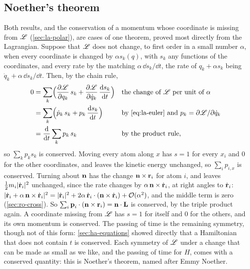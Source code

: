 \subsection*{Noether's theorem}

Both results, and the conservation of a momentum whose coordinate is
missing from $\mathscr{L}$ (\cref{sec:la-polar}), are cases of one theorem,
proved most directly from the Lagrangian. Suppose that $\mathscr{L}$ does not
change, to first order in a small number $\alpha$, when every coordinate
is changed by $\alpha s_k(q)$, with $s_k$ any functions of the
coordinates, and every rate by the matching $\alpha\,\dd s_k/\dd t$, the
rate of $q_k + \alpha s_k$ being $\dot{q}_k + \alpha\,\dd s_k/\dd t$. Then,
by the chain rule,
\begin{align*}
   0 &= \sum_k\Bigl(\frac{\partial\Lag}{\partial q_k}\,s_k
   + \frac{\partial\Lag}{\partial\dot{q}_k}\,\frac{\dd s_k}{\dd t}\Bigr)
   && \text{the change of $\Lag$ per unit of $\alpha$}\\
   &= \sum_k\Bigl(\dot{p}_k\,s_k + p_k\,\frac{\dd s_k}{\dd t}\Bigr)
   && \text{by \cref{eq:la-euler} and $p_k = \partial\Lag/\partial
   \dot{q}_k$}\\
   &= \frac{\dd}{\dd t}\sum_k p_k\,s_k
   && \text{by the product rule,}
\end{align*}
so $\sum_k p_ks_k$ is conserved. Moving every atom along $x$ has $s = 1$
for every $x_i$ and 0 for the other coordinates, and leaves the kinetic
energy unchanged, so $\sum_ip_{i,x}$ is conserved. Turning about
$\bm{\mathrm{n}}$ has the change $\bm{\mathrm{n}}\times\bm{\mathrm{r}}_i$ for atom $i$, and leaves
$\frac12 m_i\lvert\dot{\bm{\mathrm{r}}}_i\rvert^2$ unchanged, since the rate
changes by $\alpha\,\bm{\mathrm{n}}\times\dot{\bm{\mathrm{r}}}_i$, at right angles to
$\dot{\bm{\mathrm{r}}}_i$: $\lvert\dot{\bm{\mathrm{r}}}_i + \alpha\,\bm{\mathrm{n}}\times\dot{\bm{\mathrm{r}}}_i
\rvert^2 = \lvert\dot{\bm{\mathrm{r}}}_i\rvert^2 + 2\alpha\,\dot{\bm{\mathrm{r}}}_i\cdot
(\bm{\mathrm{n}}\times\dot{\bm{\mathrm{r}}}_i) + \mathcal{O}(\alpha^2)$, and the middle term is
zero (\cref{sec:ro-cross}). So $\sum_i\bm{\mathrm{p}}_i\cdot(\bm{\mathrm{n}}\times\bm{\mathrm{r}}_i)
= \bm{\mathrm{n}}\cdot\bm{\mathrm{L}}$ is conserved, by the triple product again. A
coordinate missing from $\mathscr{L}$ has $s = 1$ for itself and 0 for the
others, and its own momentum is conserved. The passing of time is the
remaining symmetry, though not of this form: \cref{sec:ha-equations}
showed directly that a Hamiltonian that does not contain $t$ is
conserved. Each symmetry of $\mathscr{L}$ under a change that can be made as
small as we like, and the passing of time for $H$, comes with a conserved
quantity: this is Noether's theorem, named after Emmy Noether.

